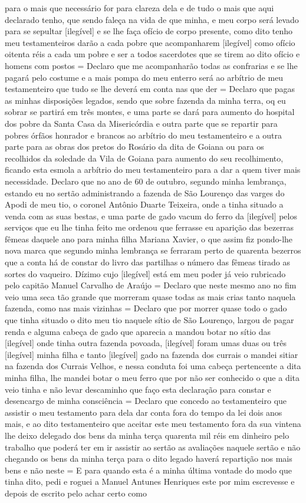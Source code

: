 \begin{refsection}
para o mais que necessário for para clareza dela e de tudo o mais que aqui declarado tenho, que sendo faleça na vida de que minha, e meu corpo será levado para se sepultar [ilegível] e se lhe faça ofício de corpo presente, como dito tenho meu testamenteiros darão a cada pobre que acompanharem [ilegível] como ofício oitenta réis a cada um pobre e ser a todos sacerdotes que se tirem ao dito ofício e homens com postos = Declaro que me acompanharão todas as confrarias e se lhe pagará pelo costume e a mais pompa do meu enterro será ao arbítrio de meu testamenteiro que tudo se lhe deverá em conta nas que der = Declaro que pagas as minhas disposições legados, sendo que sobre fazenda da minha terra, oq eu sobrar se partirá em três montes, e uma parte se dará para aumento do hospital dos pobre da Santa Casa da Misericórdia e outra parte que se repartir para pobres órfãos honrador e brancos ao arbítrio do meu testamenteiro e a outra parte para as obras dos pretos do Rosário da dita de Goiana ou para os recolhidos da soledade da Vila de Goiana para aumento do seu recolhimento, ficando esta esmola a arbítrio do meu testamenteiro para a dar a quem tiver mais necessidade. Declaro que no ano de 60 de outubro, segundo minha lembrança, estando eu no sertão administrando a fazenda de São Lourenço das varges do Apodi de meu tio, o coronel Antônio Duarte Teixeira, onde a tinha situado a venda com as suas bestas, e uma parte de gado vacum do ferro da [ilegível] pelos serviços que eu lhe tinha feito me ordenou que ferrasse eu aparição das bezerras fêmeas daquele ano para minha filha Mariana Xavier, o que assim fiz pondo-lhe nova marca que segundo minha lembrança se ferraram perto de quarenta bezerros que a conta há de constar do livro das partilhas o número das fêmeas tirado as sortes do vaqueiro. Dízimo cujo [ilegível] está em meu poder já veio rubricado pelo capitão Manuel Carvalho de Araújo = Declaro que neste mesmo ano no fim veio uma seca tão grande que morreram quase todas as mais crias tanto naquela fazenda, como nas mais vizinhas = Declaro que por morrer quase todo o gado que tinha situado o dito meu tio naquele sítio de São Lourenço, largou de pagar renda e alguma cabeça de gado que aparecia a mandou botar no sítio das [ilegível] onde tinha outra fazenda povoada, [ilegível] foram umas duas ou três [ilegível] minha filha e tanto [ilegível] gado na fazenda dos currais o mandei sitiar na fazenda dos Currais Velhos, e nessa conduta foi uma cabeça pertencente a dita minha filha, lhe mandei botar o meu ferro que por não ser conhecido o que a dita veio tinha e não levar descaminho que faço esta declaração para constar e desencargo de minha consciência = Declaro que concedo ao testamenteiro que assistir o meu testamento para dela dar conta fora do tempo da lei dois anos mais, e ao dito testamenteiro que aceitar este meu testamento fora da sua vintena lhe deixo delegado dos bens da minha terça quarenta mil réis em dinheiro pelo trabalho que poderá ter em ir assistir ao sertão as avaliações naquele sertão e não chegando os bens da minha terça para o dito legado haverá repartição nos mais bens e não neste = E para quando esta é a minha última vontade do modo que tinha dito, pedi e roguei a Manuel Antunes Henriques este por mim escrevesse e depois de escrito pelo achar certo como 
\end{refsection}
